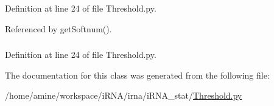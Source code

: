 \-Definition at line 24 of file \-Threshold.\-py.



\-Referenced by get\-Softnum().

\hypertarget{classirna_1_1iRNA__stat_1_1Threshold_1_1Threshold_a0fa98d77361a0885579f37b537a69cb1}{
\subsubsection[{threshold}]{}}
\label{classirna_1_1iRNA__stat_1_1Threshold_1_1Threshold_a0fa98d77361a0885579f37b537a69cb1}


\-Definition at line 24 of file \-Threshold.\-py.



\-The documentation for this class was generated from the following file\-:\begin{DoxyCompactItemize}
\item 
/home/amine/workspace/i\-R\-N\-A/irna/i\-R\-N\-A\-\_\-stat/\hyperlink{Threshold_8py}{\-Threshold.\-py}\end{DoxyCompactItemize}
